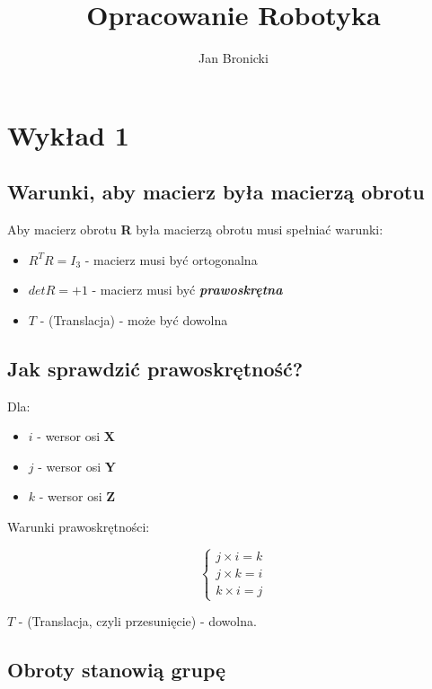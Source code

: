 \documentclass{article}
\title{Opracowanie Robotyka}
\author{Jan Bronicki}
\date{}
\begin{document}
\maketitle



\section{Wykład 1}


\subsection{Warunki, aby macierz była macierzą obrotu}

Aby macierz obrotu {\bf R} była macierzą obrotu musi spełniać warunki:

\begin{itemize}
    \item $R^{T}R=I_{3}$ - macierz musi być ortogonalna
    \item $det R=+1$ - macierz musi być {\bf \it prawoskrętna}
    \item $T$ - (Translacja) - może być dowolna
\end{itemize}

\subsection{Jak sprawdzić prawoskrętność?}

Dla:

\begin{itemize}
    \item $i$ - wersor osi {\bf X}
    \item $j$ - wersor osi {\bf Y}
    \item $k$ - wersor osi {\bf Z}
\end{itemize}

Warunki prawoskrętności:

\Large
$$
	\left\{
	\begin{array}{l}
		j \times i = k \\
		j \times k = i \\
		k \times i = j
	\end{array}
	\right.
$$
\normalsize

{\bf $T$} - (Translacja, czyli przesunięcie) - dowolna.

\subsection{Obroty stanowią grupę}
\end{document}
